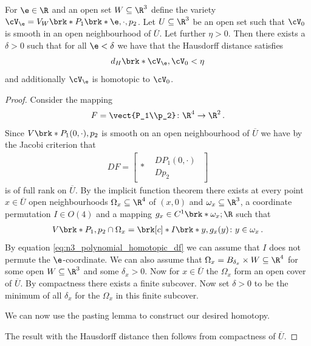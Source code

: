 \begin{proposition}\label{pr:n3_polynomial_convergenceSmoothSet}
  For $\e\in\R$ and an open set $W\subseteq\R^3$ define the variety $\cV_\e=V_W\brk*{P_1\brk*{\e,\cdot},p_2}$.
  Let $U\subseteq \R^3$ be an open set such that $\cV_0$ is smooth
  in an open neighbourhood of $\overline{U}$. Let further $\eta>0$.
  Then there exists a $\delta>0$ such that for all $\e<\delta$ we have that the Hausdorff distance
  satisfies
  \begin{align*}
    d_H\brk*{\cV_\e,\cV_0}<\eta
  \end{align*}
  and additionally $\cV_\e$ is homotopic to $\cV_0$.
\end{proposition}
\begin{proof}
  Consider the mapping
  \begin{align*}
    F=\vect{P_1\\p_2}\colon \R^4\to\R^2\,.
  \end{align*}
  Since $V\brk*{P_1(0,\cdot),p_2}$ is smooth on an open neighbourhood of $\overline{U}$
  we have by the Jacobi criterion that
  \begin{align}
    DF = \left[\begin{array}{c|c}
      *&\begin{array}{c}
        D P_1(0,\cdot)\\
        D p_2
      \end{array}
    \end{array}\right]\label{eq:n3_polynomial_homotopic_df}
  \end{align}
  is of full rank on $\overline{U}$.
  By the implicit function theorem there exists at every point $x\in\overline{U}$ open neighbourhoods
  $\Omega_x\subseteq \R^4$ of $(x,0)$ and $\omega_x\subseteq\R^3$, a coordinate permutation $I\in O(4)$
  and a mapping $g_x\in C^1\brk*{\omega_x;\R}$ such that
  \begin{align*}
    V\brk*{P_1,p_2}\cap \Omega_x=\brk[c]*{I\brk*{y,g_x(y)}\colon y\in\omega_x}\,.
  \end{align*}
  By equation \eqref{eq:n3_polynomial_homotopic_df} we can assume that $I$ does not permute the $\e$-coordinate.
  We can also assume that $\Omega_x=B_{\delta_x}\times W\subseteq\R^4$ for some open $W\subseteq\R^3$ and 
  some $\delta_x>0$.
  Now for $x\in\overline{U}$ the $\Omega_x$ form an open cover of $\overline{U}$.
  By compactness there exists a finite subcover. Now set $\delta>0$ to be the minimum of all 
  $\delta_x$ for the $\Omega_x$ in this finite subcover.

  We can now use the pasting lemma to construct our desired homotopy.

  The result with the Hausdorff distance then follows from compactness of $\overline{U}$.
\end{proof}

